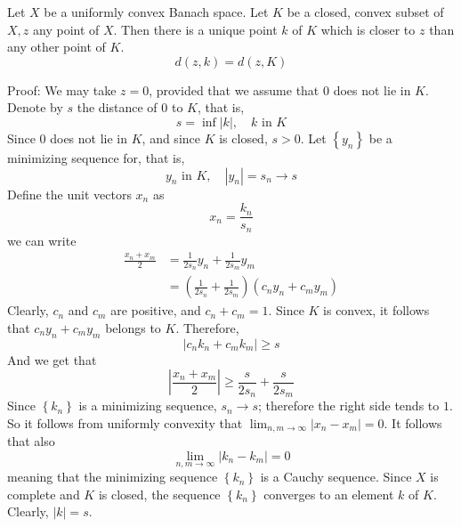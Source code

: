 \documentclass[12pt, oneside]{book}
\begin{document}
\begin{theorem}
    Let $X$ be a uniformly convex Banach space. Let $K$ be a closed, convex subset of $X, z$ any point of $X$. Then there is a unique point $k$ of $K$ which is closer to $z$ than any other point of $K$.
    \begin{equation*}
        d(z,k) =d(z,K)
    \end{equation*}

    Proof:
    We may take $z=0$, provided that we assume that 0 does not lie in $K$. Denote by $s$ the distance of 0 to $K$, that is,
    \begin{equation*}
        s=\inf |k|, \quad k \text { in } K
    \end{equation*}
    Since $0$ does not lie in $K$, and since $K$ is closed, $s>0$. Let $\left\{y_n\right\}$ be a minimizing sequence for, that is,
    \begin{equation*}
        y_n \text { in } K, \quad\left|y_n\right|=s_n \rightarrow s
    \end{equation*}
    Define the unit vectors $x_n$ as
    \begin{equation*}
        x_n=\frac{k_n}{s_n}
    \end{equation*}
    we can write
    \begin{equation*}
        \begin{aligned}
            \frac{x_n+x_m}{2} & =\frac{1}{2 s_n} y_n+\frac{1}{2 s_m} y_m                                  \\
                              & =\left(\frac{1}{2 s_n}+\frac{1}{2 s_m}\right)\left(c_n y_n+c_m y_m\right)
        \end{aligned}
    \end{equation*}
    Clearly, $c_n$ and $c_m$ are positive, and $c_n+c_m=1$. Since $K$ is convex, it follows that $c_n y_n+c_m y_m$ belongs to $K$. Therefore,
    \begin{equation*}
        \left|c_n k_n+c_m k_m\right| \geq s
    \end{equation*}
    And we get that
    \begin{equation*}
        \left|\frac{x_n+x_m}{2}\right| \geq \frac{s}{2 s_n}+\frac{s}{2 s_m}
    \end{equation*}
    Since $\left\{k_n\right\}$ is a minimizing sequence, $s_n \rightarrow s$; therefore the right side tends to $1$. So it follows from uniformly convexity that $\lim _{n, m \rightarrow \infty}\left|x_n-x_m\right|=0$.
    It follows that also
    \begin{equation*}
        \lim_{n, m \rightarrow \infty}\left|k_n-k_m\right|=0
    \end{equation*}
    meaning that the minimizing sequence $\left\{k_n\right\}$ is a Cauchy sequence. Since $X$ is complete and $K$ is closed, the sequence $\left\{k_n\right\}$ converges to an element $k$ of $K$. Clearly, $|k|=s$.
\end{theorem}
\end{document}
